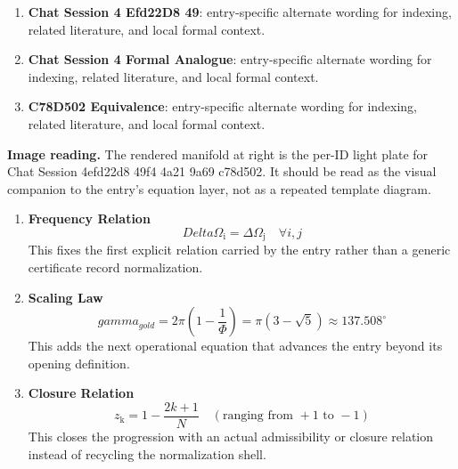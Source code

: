 \begin{enumerate}[leftmargin=1.6em,itemsep=6pt,topsep=4pt]
\item \textbf{Chat Session 4 Efd22D8 49}: entry-specific alternate wording for indexing, related literature, and local formal context.
\item \textbf{Chat Session 4 Formal Analogue}: entry-specific alternate wording for indexing, related literature, and local formal context.
\item \textbf{C78D502 Equivalence}: entry-specific alternate wording for indexing, related literature, and local formal context.
\end{enumerate}

\begin{samepage}
\noindent\begin{minipage}[t]{0.45\linewidth}
\vspace{0pt}
\raggedright
\scriptsize\textbf{Image reading.} The rendered manifold at right is the per-ID light plate for Chat Session 4efd22d8 49f4 4a21 9a69 c78d502. It should be read as the visual companion to the entry's equation layer, not as a repeated template diagram.\par
\end{minipage}\hfill
\begin{minipage}[t]{0.53\linewidth}
\vspace*{-0.10in}
\raggedright
{}
\end{minipage}
\end{samepage}

\clearpage


\begin{enumerate}[leftmargin=1.6em,itemsep=9pt,topsep=6pt]
\item \textbf{Frequency Relation}
\[
Delta \Omega_{\mathrm{i}} = \Delta \Omega_{\mathrm{j}} \quad \forall i, j
\]
This fixes the first explicit relation carried by the entry rather than a generic certificate record normalization.

\item \textbf{Scaling Law}
\[
gamma_{gold} = 2\pi (1 - \frac{1}{\Phi}) = \pi(3 - \sqrt{5}) \approx 137.508^\circ
\]
This adds the next operational equation that advances the entry beyond its opening definition.

\item \textbf{Closure Relation}
\[
z_{\mathrm{k}} = 1 - \frac{2k+1}{N} \quad (\text{ranging from } +1 \text{ to } -1)
\]
This closes the progression with an actual admissibility or closure relation instead of recycling the normalization shell.
\end{enumerate}

